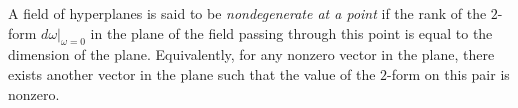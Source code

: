 A field of hyperplanes is said to be \textit{nondegenerate at a point} if the rank of the $2$-form $d\omega|_{\omega=0}$ in the plane of the field passing through this point is equal to the dimension of the plane. Equivalently, for any nonzero vector in the plane, there exists another vector in the plane such that the value of the $2$-form on this pair is nonzero.
